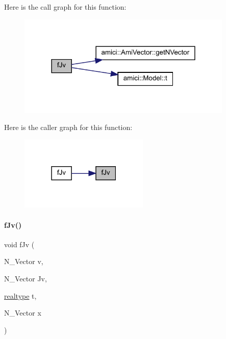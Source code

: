 Here is the call graph for this function\+:
\nopagebreak
\begin{figure}[H]
\begin{center}
\leavevmode
\includegraphics[width=290pt]{classamici_1_1_model___o_d_e_a1a0549510cbe20e4d3c28bf77fc722ed_cgraph}
\end{center}
\end{figure}
Here is the caller graph for this function\+:
\nopagebreak
\begin{figure}[H]
\begin{center}
\leavevmode
\includegraphics[width=174pt]{classamici_1_1_model___o_d_e_a1a0549510cbe20e4d3c28bf77fc722ed_icgraph}
\end{center}
\end{figure}
\mbox{\label{classamici_1_1_model___o_d_e_a01252ccb85bec7adbc88d12fce4fde05}} 
\paragraph{\texorpdfstring{fJv()}{fJv()}\hspace{0.1cm}{\footnotesize\ttfamily [2/3]}}
{\footnotesize\ttfamily void f\+Jv (\begin{DoxyParamCaption}\item[{N\+\_\+\+Vector}]{v,  }\item[{N\+\_\+\+Vector}]{Jv,  }\item[{\mbox{\hyperlink{namespaceamici_a1bdce28051d6a53868f7ccbf5f2c14a3}{realtype}}}]{t,  }\item[{N\+\_\+\+Vector}]{x }\end{DoxyParamCaption})}

